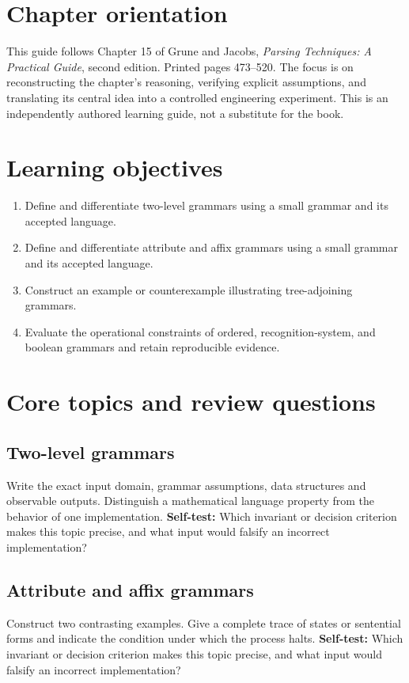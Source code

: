 \documentclass[11pt,letterpaper]{article}
\begin{document}
\makedoctitle\makedocsummary
\tableofcontents\clearpage
\section{Chapter orientation}
This guide follows Chapter 15 of Grune and Jacobs, \emph{Parsing Techniques: A Practical Guide}, second edition. Printed pages 473--520. The focus is on reconstructing the chapter's reasoning, verifying explicit assumptions, and translating its central idea into a controlled engineering experiment. This is an independently authored learning guide, not a substitute for the book.
\section{Learning objectives}
\begin{enumerate}
\item Define and differentiate two-level grammars using a small grammar and its accepted language.
\item Define and differentiate attribute and affix grammars using a small grammar and its accepted language.
\item Construct an example or counterexample illustrating tree-adjoining grammars.
\item Evaluate the operational constraints of ordered, recognition-system, and boolean grammars and retain reproducible evidence.
\end{enumerate}
\section{Core topics and review questions}
\subsection{Two-level grammars}
Write the exact input domain, grammar assumptions, data structures and observable outputs. Distinguish a mathematical language property from the behavior of one implementation.
\textbf{Self-test:} Which invariant or decision criterion makes this topic precise, and what input would falsify an incorrect implementation?
\subsection{Attribute and affix grammars}
Construct two contrasting examples. Give a complete trace of states or sentential forms and indicate the condition under which the process halts.
\textbf{Self-test:} Which invariant or decision criterion makes this topic precise, and what input would falsify an incorrect implementation?
\end{document}
